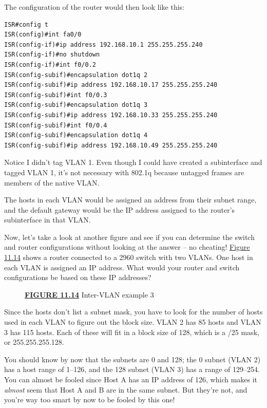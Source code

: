 The configuration of the router would then look like this:

\begin{verbatim}
ISR#config t
ISR(config)#int fa0/0
ISR(config-if)#ip address 192.168.10.1 255.255.255.240
ISR(config-if)#no shutdown
ISR(config-if)#int f0/0.2
ISR(config-subif)#encapsulation dot1q 2
ISR(config-subif)#ip address 192.168.10.17 255.255.255.240
ISR(config-subif)#int f0/0.3
ISR(config-subif)#encapsulation dot1q 3
ISR(config-subif)#ip address 192.168.10.33 255.255.255.240
ISR(config-subif)#int f0/0.4
ISR(config-subif)#encapsulation dot1q 4
ISR(config-subif)#ip address 192.168.10.49 255.255.255.240
\end{verbatim}

Notice I didn't tag VLAN 1. Even though I could have created a
subinterface and tagged VLAN 1, it's not necessary with 802.1q because
untagged frames are members of the native VLAN.

The hosts in each VLAN would be assigned an address from their subnet
range, and the default gateway would be the IP address assigned to the
router's subinterface in that VLAN.

Now, let's take a look at another figure and see if you can determine
the switch and router configurations without looking at the answer -- no
cheating! \protect\hyperlink{c11.xhtmlux5cux23figure11-14}{Figure 11.14}
shows a router connected to a 2960 switch with two VLANs. One host in
each VLAN is assigned
an IP address. What
would your router and switch configurations be based on these IP
addresses?

\begin{figure}
\centering
\caption{{\protect\hyperlink{c11.xhtmlux5cux23figureanchor11-14}{\textbf{FIGURE
11.14}} Inter-VLAN example 3}}
\end{figure}

Since the hosts don't list a subnet mask, you have to look for the
number of hosts used in each VLAN to figure out the block size. VLAN 2
has 85 hosts and VLAN 3 has 115 hosts. Each of these will fit in a block
size of 128, which is a /25 mask, or 255.255.255.128.

You should know by now that the subnets are 0 and 128; the 0 subnet
(VLAN 2) has a host range of 1--126, and the 128 subnet (VLAN 3) has a
range of 129--254. You can almost be fooled since Host A has an IP
address of 126, which makes it \emph{almost} seem that Host A and B are
in the same subnet. But they're not, and you're way too smart by now to
be fooled by this one!

